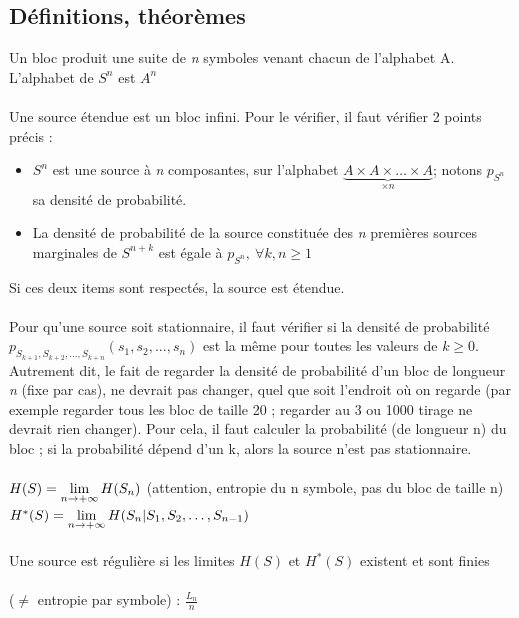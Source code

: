 \documentclass[11pt,a4paper]{article}
\begin{document}
\subsection{Définitions, théorèmes}
 Un bloc produit une suite de \textit{n} symboles venant chacun de l'alphabet A. L'alphabet de $S^n$ est $A^n$\\
\\
 Une source étendue est un bloc infini. Pour le vérifier, il faut vérifier 2 points précis :
\begin{itemize}
	\item   $S^n$ est une source à \textit{n} composantes, sur l’alphabet $\underbrace{A \times A \times \ldots \times A}_{\times n}$; notons $p_{S^n}$ sa densité de probabilité.
	\item La densité de probabilité de la source constituée des \textit{n} premières sources marginales de $S^{n+k}$ est égale à $p_{S^n},\ \forall k,n \geq 1$
\end{itemize}
Si ces deux items sont respectés, la source est étendue.\\
\\
 Pour qu'une source soit stationnaire, il faut vérifier si la densité de probabilité $p_{S_{k+1},S_{k+2},...,S_{k+n}}(s_1,s_2,...,s_n)$ est la même pour toutes les valeurs de $k\geq 0$. Autrement dit, le fait de regarder la densité de probabilité d'un bloc de longueur \textit{n} (fixe par cas), ne devrait pas changer, quel que soit l'endroit où on regarde (par exemple regarder tous les bloc de taille 20 ; regarder au 3 ou 1000 tirage ne devrait rien changer). Pour cela, il faut calculer la probabilité (de longueur n) du bloc ; si la probabilité dépend d'un k, alors la source n'est pas stationnaire.\\
\\
 $H(S) = \lim\limits_{n \to +\infty} H(S_n)$ (attention, entropie du n symbole, pas du bloc de taille n)\\
 $H^*(S) = \lim\limits_{n\to +\infty} H(S_n | S_1,S_2,\ldots,S_{n-1})$\\
\\
 Une source est régulière si les limites $H(S)$ et $H^*(S)$ existent et sont finies\\
\\
 ($\neq$ entropie par symbole) : $\frac{L_n}{n}$\\
\end{document}
